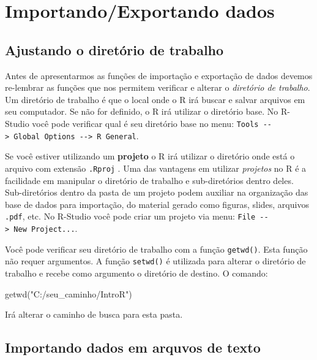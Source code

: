 \documentclass[
]{book}
\newenvironment{Shaded}{\begin{snugshade}}{\end{snugshade}}
\newcommand{\FunctionTok}[1]{\textcolor[rgb]{0.00,0.00,0.00}{#1}}
\newcommand{\NormalTok}[1]{#1}
\newcommand{\StringTok}[1]{\textcolor[rgb]{0.31,0.60,0.02}{#1}}
\begin{document}
\hypertarget{importe}{%
\chapter{Importando/Exportando dados}\label{importe}}

\hypertarget{ajustando-o-diretuxf3rio-de-trabalho}{%
\section{Ajustando o diretório de trabalho}\label{ajustando-o-diretuxf3rio-de-trabalho}}

Antes de apresentarmos as funções de importação e exportação de dados devemos re-lembrar as funções que nos permitem verificar e alterar o \emph{diretório de trabalho}. Um diretório de trabalho é que o local onde o R irá buscar e salvar arquivos em seu computador. Se não for definido, o R irá utilizar o diretório base. No R-Studio você pode verificar qual é seu diretório base no menu: \texttt{Tools\ -\/-\textgreater{}\ Global\ Options\ -\/-\textgreater{}\ R\ General}.

Se você estiver utilizando um \textbf{projeto} o R irá utilizar o diretório onde está o arquivo com extensão \texttt{.Rproj} . Uma das vantagens em utilizar \emph{projetos} no R é a facilidade em manipular o diretório de trabalho e sub-diretórios dentro deles. Sub-diretórios dentro da pasta de um projeto podem auxiliar na organização das base de dados para importação, do material gerado como figuras, slides, arquivos \texttt{.pdf}, etc. No R-Studio você pode criar um projeto via menu: \texttt{File\ -\/-\textgreater{}\ New\ Project...}.

Você pode verificar seu diretório de trabalho com a função \texttt{getwd()}. Esta função não requer argumentos. A função \texttt{setwd()} é utilizada para alterar o diretório de trabalho e recebe como argumento o diretório de destino. O comando:

\begin{Shaded}
\begin{Highlighting}[]
\FunctionTok{getwd}\NormalTok{(}\StringTok{"C:/seu\_caminho/IntroR"}\NormalTok{)}
\end{Highlighting}
\end{Shaded}

Irá alterar o caminho de busca para esta pasta.

\hypertarget{importando-dados-em-arquvos-de-texto}{%
\section{Importando dados em arquvos de texto}\label{importando-dados-em-arquvos-de-texto}}
\end{document}
